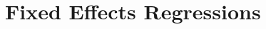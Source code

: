 \documentclass[11pt]{paper}
\begin{document}
%
%
%
%
%
%
%
%
%
%
%

%
%
%
%



\section*{Fixed Effects Regressions}
\end{document}

